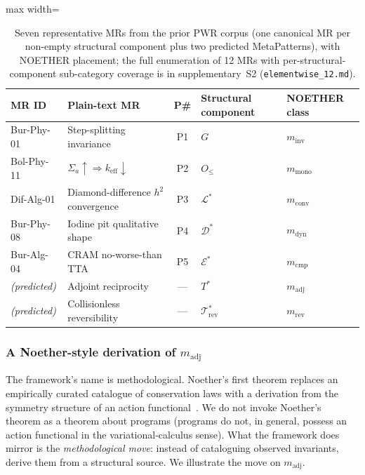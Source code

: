 \documentclass[acmsmall,screen,review]{acmart}
\begin{document}
\begin{table}[h]
\centering
\caption{Seven representative MRs from the prior PWR corpus (one canonical MR per non-empty structural component plus two predicted MetaPatterns), with NOETHER placement; the full enumeration of 12 MRs with per-structural-component sub-category coverage is in supplementary~S2 (\texttt{elementwise\_12.md}).}
\label{tab:elementwise}
\footnotesize
\begin{adjustbox}{max width=\textwidth}
\begin{tabular}{llcll}
\toprule
\textbf{MR ID} & \textbf{Plain-text MR} & \textbf{P\#} & \textbf{Structural component} & \textbf{NOETHER class} \\
\midrule
Bur-Phy-01 & Step-splitting invariance & P1 & $G$ & $m_{\mathrm{inv}}$ \\
Bol-Phy-11 & $\Sigma_a\!\uparrow \Rightarrow k_{\mathrm{eff}}\!\downarrow$ & P2 & $O_{\le}$ & $m_{\mathrm{mono}}$ \\
Dif-Alg-01 & Diamond-difference $h^2$ convergence & P3 & $\mathcal{L}^{*}$ & $m_{\mathrm{conv}}$ \\
Bur-Phy-08 & Iodine pit qualitative shape & P4 & $\mathcal{D}^{*}$ & $m_{\mathrm{dyn}}$ \\
Bur-Alg-04 & CRAM no-worse-than TTA & P5 & $\mathcal{E}^{*}$ & $m_{\mathrm{cmp}}$ \\
\textit{(predicted)} & Adjoint reciprocity & --- & $T^{*}$ & $m_{\mathrm{adj}}$ \\
\textit{(predicted)} & Collisionless reversibility & --- & $\mathcal{T}^{*}_{\mathrm{rev}}$ & $m_{\mathrm{rev}}$ \\
\bottomrule
\end{tabular}
\end{adjustbox}
\end{table}

\subsubsection{A Noether-style derivation of \texorpdfstring{$m_{\mathrm{adj}}$}{m\_adj}}
\label{subsec:noether-mAdj}

The framework's name is methodological. Noether's first theorem replaces an empirically curated catalogue of conservation laws with a derivation from the symmetry structure of an action functional~\cite{Noether1918}. We do not invoke Noether's theorem as a theorem about programs (programs do not, in general, possess an action functional in the variational-calculus sense). What the framework does mirror is the \emph{methodological move}: instead of cataloguing observed invariants, derive them from a structural source. We illustrate the move on $m_{\mathrm{adj}}$.
\end{document}
